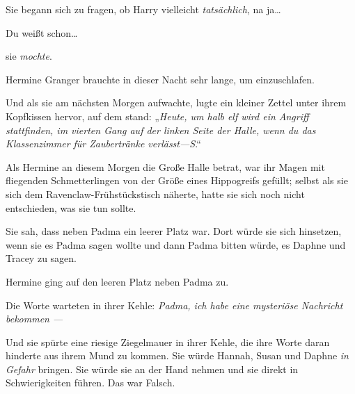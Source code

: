 Sie begann sich zu fragen, ob Harry vielleicht \emph{tatsächlich}, na ja…

Du weißt schon…

sie \emph{mochte}.

Hermine Granger brauchte in dieser Nacht sehr lange, um einzuschlafen.

Und als sie am nächsten Morgen aufwachte, lugte ein kleiner Zettel unter ihrem Kopfkissen hervor, auf dem stand: „\emph{Heute, um halb elf wird ein Angriff stattfinden, im vierten Gang auf der linken Seite der Halle, wenn du das Klassenzimmer für Zaubertränke verlässt—S}.“

\later

Als Hermine an diesem Morgen die Große Halle betrat, war ihr Magen mit fliegenden Schmetterlingen von der Größe eines Hippogreifs gefüllt; selbst als sie sich dem Ravenclaw-Frühstückstisch näherte, hatte sie sich noch nicht entschieden, was sie tun sollte.

Sie sah, dass neben Padma ein leerer Platz war. Dort würde sie sich hinsetzen, wenn sie es Padma sagen wollte und dann Padma bitten würde, es Daphne und Tracey zu sagen.

Hermine ging auf den leeren Platz neben Padma zu.

Die Worte warteten in ihrer Kehle: \emph{Padma, ich habe eine mysteriöse Nachricht bekommen} \emph{—}

Und sie spürte eine riesige Ziegelmauer in ihrer Kehle, die ihre Worte daran hinderte aus ihrem Mund zu kommen. Sie würde Hannah, Susan und Daphne \emph{in Gefahr} bringen. Sie würde sie an der Hand nehmen und sie direkt in Schwierigkeiten führen. Das war Falsch.


